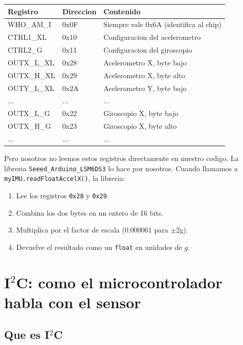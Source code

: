 \documentclass[11pt,a4paper]{article}
\begin{document}
\begin{center}
\begin{tabular}{lll}
\hline
\textbf{Registro} & \textbf{Direccion} & \textbf{Contenido} \\
\hline
WHO\_AM\_I & 0x0F & Siempre vale 0x6A (identifica al chip) \\
CTRL1\_XL & 0x10 & Configuracion del acelerometro \\
CTRL2\_G & 0x11 & Configuracion del giroscopio \\
OUTX\_L\_XL & 0x28 & Acelerometro X, byte bajo \\
OUTX\_H\_XL & 0x29 & Acelerometro X, byte alto \\
OUTY\_L\_XL & 0x2A & Acelerometro Y, byte bajo \\
... & ... & ... \\
OUTX\_L\_G & 0x22 & Giroscopio X, byte bajo \\
OUTX\_H\_G & 0x23 & Giroscopio X, byte alto \\
... & ... & ... \\
\hline
\end{tabular}
\end{center}

Pero nosotros no leemos estos registros directamente en nuestro
codigo. La libreria \texttt{Seeed\_Arduino\_LSM6DS3} lo hace por
nosotros. Cuando llamamos a \texttt{myIMU.readFloatAccelX()}, la
libreria:
\begin{enumerate}
    \item Lee los registros \texttt{0x28} y \texttt{0x29}.
    \item Combina los dos bytes en un entero de 16 bits.
    \item Multiplica por el factor de escala ($0.000061$ para $\pm$2g).
    \item Devuelve el resultado como un \texttt{float} en unidades de $g$.
\end{enumerate}


\section{I$^2$C: como el microcontrolador habla con el sensor}

\subsection{Que es I$^2$C}
\end{document}
